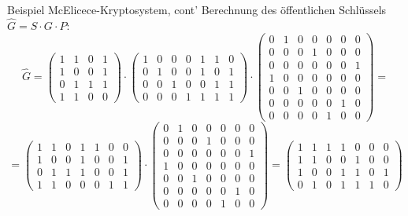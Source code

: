 \documentclass[11pt%
,aspectratio=169%
]{beamer}
\begin{document}
\begin{frame}{Beispiel McElicece-Kryptosystem, cont'}
Berechnung des öffentlichen Schlüssels $\hat{G} = S \cdot G \cdot P$:
$$
    \hat{G}=\begin{pmatrix} 1 & 1 & 0 & 1 \\ 1 & 0 & 0 & 1 \\ 0 & 1 & 1 & 1 \\ 1 & 1 & 0 & 0 \end{pmatrix} \cdot \begin{pmatrix} 1 & 0 & 0 & 0 & 1 & 1 & 0 \\ 0 & 1 & 0 & 0 & 1 & 0 & 1 \\ 0 & 0 & 1 & 0 & 0 & 1 & 1 \\ 0 & 0 & 0 & 1 & 1 & 1 & 1 \end{pmatrix} \cdot \begin{pmatrix} 0 & 1 & 0 & 0 & 0 & 0 & 0 \\ 0 & 0 & 0 & 1 & 0 & 0 & 0 \\ 0 & 0 & 0 & 0 & 0 & 0 & 1 \\ 1 & 0 & 0 & 0 & 0 & 0 & 0 \\ 0 & 0 & 1 & 0 & 0 & 0 & 0 \\ 0 & 0 & 0 & 0 & 0 & 1 & 0 \\ 0 & 0 & 0 & 0 & 1 & 0 & 0 \end{pmatrix}=
$$
$$
    =\begin{pmatrix} 1 & 1 & 0 & 1 & 1 & 0 & 0 \\ 1 & 0 & 0 & 1 & 0 & 0 & 1 \\ 0 & 1 & 1 & 1 & 0 & 0 & 1 \\ 1 & 1 & 0 & 0 & 0 & 1 & 1 \end{pmatrix} \cdot \begin{pmatrix} 0 & 1 & 0 & 0 & 0 & 0 & 0 \\ 0 & 0 & 0 & 1 & 0 & 0 & 0 \\ 0 & 0 & 0 & 0 & 0 & 0 & 1 \\ 1 & 0 & 0 & 0 & 0 & 0 & 0 \\ 0 & 0 & 1 & 0 & 0 & 0 & 0 \\ 0 & 0 & 0 & 0 & 0 & 1 & 0 \\ 0 & 0 & 0 & 0 & 1 & 0 & 0 \end{pmatrix}= \begin{pmatrix} 1 & 1 & 1 & 1 & 0 & 0 & 0 \\ 1 & 1 & 0 & 0 & 1 & 0 & 0 \\ 1 & 0 & 0 & 1 & 1 & 0 & 1 \\ 0 & 1 & 0 & 1 & 1 & 1 & 0 \end{pmatrix}
$$
\end{frame}
\end{document}
